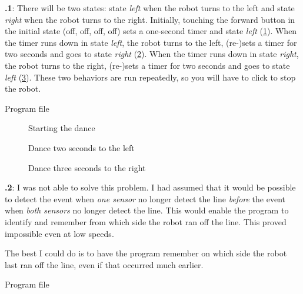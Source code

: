 \documentclass[12pt,a4paper,english]{article}
\begin{document}
\textbf{\thesection.1}:
There will be two states: state \emph{left}  when the
robot turns to the left and state \emph{right}  when
the robot turns to the right. Initially, touching the forward button in
the initial state (off, off, off, off) sets a one-second timer and state
\emph{left} (\cref{fig.dance-start}). When the timer runs down in
state \emph{left}, the robot turns to the left, (re-)sets a timer for
two seconds and goes to state \emph{right}
(\cref{fig.dance-left}). When the timer runs down in state
\emph{right}, the robot turns to the right, (re-)sets a timer for two
seconds and goes to state \emph{left} (\cref{fig.dance-right}).
These two behaviors are run repeatedly, so you will have to click
 to stop the robot.

{\raggedleft \hfill Program file }


\begin{figure}
\begin{center}
\caption{Starting the dance}\label{fig.dance-start}
\end{center}
\end{figure}

\begin{figure}
\begin{center}
\caption{Dance two seconds to the left}\label{fig.dance-left}
\end{center}
\end{figure}

\begin{figure}
\begin{center}
\caption{Dance three seconds to the right}\label{fig.dance-right}
\end{center}
\end{figure}

\textbf{\thesection.2}:
I was not able to solve this problem. I had assumed that it would be
possible to detect the event when \emph{one sensor} no longer detect the
line \emph{before} the event when \emph{both sensors} no longer detect
the line. This would enable the program to identify and remember from
which side the robot ran off the line. This proved impossible even at
low speeds.

The best I could do is to have the program remember on which side the
robot last ran off the line, even if that occurred much earlier.

{\raggedleft \hfill Program file }
\end{document}
